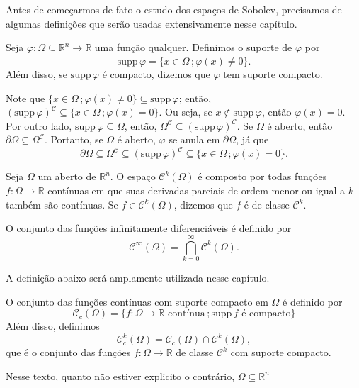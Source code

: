 \documentclass[a4paper, 11pt]{book}
\theoremstyle{definition}
\newcommand{\bR}{\mathbb{R}}
\newcommand{\cC}{\mathcal{C}}
\newcommand{\supp}{\mathrm{supp}\,}
\begin{document}
Antes de começarmos de fato o estudo dos espaços de Sobolev, precisamos de algumas definições que serão usadas extensivamente nesse capítulo.

\begin{dbox} \label{def:suporte}
    Seja $\varphi : \Omega \subseteq \bR ^n \to \bR$ uma função qualquer. Definimos o suporte de $\varphi$ por
    \[
        \supp \varphi = \overline{\{x \in \Omega \,; \varphi(x) \neq 0\}}.
    \]
    Além disso, se $\supp\varphi$ é compacto, dizemos que $\varphi$ tem suporte compacto.
\end{dbox}

Note que $\{x \in \Omega \,; \varphi(x) \neq 0\} \subseteq \supp \varphi$; então, $(\supp \varphi)^\cC \subseteq \{x \in \Omega \,; \varphi(x) = 0\}$. Ou seja, se $x \not\in \supp \varphi$, então $\varphi(x) = 0$.
Por outro lado, $\supp \varphi \subseteq \Omega$, então, $\Omega^\cC \subseteq (\supp \varphi)^\cC$.
Se $\Omega$ é aberto, então $\partial \Omega \subseteq \Omega^\cC$.
Portanto, se $\Omega$ é aberto, $\varphi$ se anula em $\partial\Omega$, já que
\[
    \partial \Omega \subseteq \Omega^\cC \subseteq (\supp \varphi)^\cC \subseteq \{x \in \Omega \,; \varphi(x) = 0\}.
\]

\begin{dbox}
    Seja $\Omega$ um aberto de $\bR^n$. O espaço $\cC^k(\Omega)$ é composto por todas funções $f : \Omega \to \bR$ contínuas em que suas derivadas parciais de ordem menor ou igual a $k$ também são contínuas.
    Se $f \in \cC^k(\Omega)$, dizemos que $f$ é de classe $\cC^k$.

    O conjunto das funções infinitamente diferenciáveis é definido por
    \[
        \cC^\infty(\Omega) = \bigcap_{k=0}^\infty \cC^k(\Omega).
    \]
\end{dbox}

A definição abaixo será amplamente utilizada nesse capítulo.

\begin{dbox}
    O conjunto das funções contínuas com suporte compacto em $\Omega$ é definido por
    \[
        \cC_c(\Omega) = \{f : \Omega \to \bR \text{ contínua} \,; \supp f \text{ é compacto}\}
    \]
    Além disso, definimos
    \[
        \cC^k_c(\Omega) = \cC_c(\Omega) \cap \cC^k(\Omega),
    \]
    que é o conjunto das funções $f : \Omega \to \bR$ de classe $\cC^k$ com suporte compacto.
\end{dbox}

Nesse texto, quanto não estiver explicito o contrário, $\Omega \subseteq \bR^n$
\end{document}
